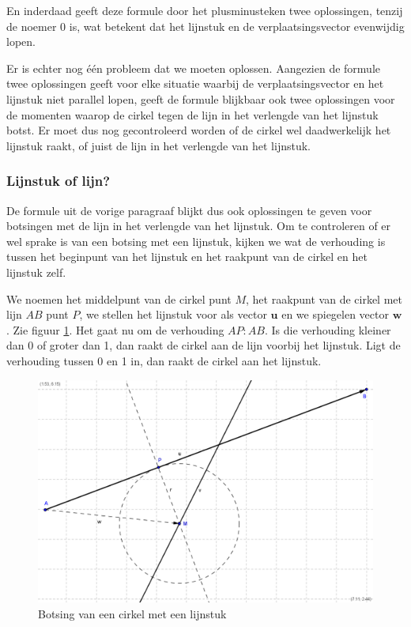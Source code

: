 \documentclass[12pt,a4paper]{article}
\begin{document}
	En inderdaad geeft deze formule door het plusminusteken twee oplossingen, tenzij de noemer $0$ is, wat betekent dat het lijnstuk en de verplaatsingsvector evenwijdig lopen.
	
	Er is echter nog \'{e}\'{e}n probleem dat we moeten oplossen. Aangezien de formule twee oplossingen geeft voor elke situatie waarbij de verplaatsingsvector en het lijnstuk niet parallel lopen, geeft de formule blijkbaar ook twee oplossingen voor de momenten waarop de cirkel tegen de lijn in het verlengde van het lijnstuk botst. Er moet dus nog gecontroleerd worden of de cirkel wel daadwerkelijk het lijnstuk raakt, of juist de lijn in het verlengde van het lijnstuk.
	
	\subsubsection{Lijnstuk of lijn?}
	De formule uit de vorige paragraaf blijkt dus ook oplossingen te geven voor botsingen met de lijn in het verlengde van het lijnstuk. Om te controleren of er wel sprake is van een botsing met een lijnstuk, kijken we wat de verhouding is tussen het beginpunt van het lijnstuk en het raakpunt van de cirkel en het lijnstuk zelf.
	
	We noemen het middelpunt van de cirkel punt $M$, het raakpunt van de cirkel met lijn $AB$ punt $P$, we stellen het lijnstuk voor als vector $\mathbf{u}$ en we spiegelen vector $\mathbf{w}$. Zie figuur \ref{botsing-lijnstuk-closeup}. Het gaat nu om de verhouding $AP:AB$. Is die verhouding kleiner dan 0 of groter dan 1, dan raakt de cirkel aan de lijn voorbij het lijnstuk. Ligt de verhouding tussen 0 en 1 in, dan raakt de cirkel aan het lijnstuk.

	\begin{figure}[h]
		\centerline{\includegraphics[width=\textwidth]{Plaatjes/Bal-Lijn-stuk-closup.png}}
		\caption{Botsing van een cirkel met een lijnstuk}
		\label{botsing-lijnstuk-closeup}
	\end{figure}	
	
\end{document}
